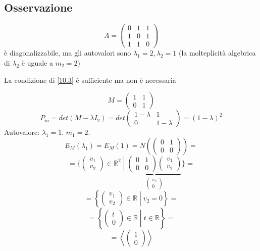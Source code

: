 \documentclass[a4paper]{article}
\theoremstyle{break}
\theoremstyle{break}
\theoremstyle{break}
\theoremstyle{break}
\begin{document}
\subsection{Osservazione}
\begin{example}
  \[
  A = \begin{pmatrix} 
    0 & 1 & 1\\
    1 & 0 & 1\\
    1 & 1 & 0
  \end{pmatrix} 
  \] 
  è diagonalizzabile, ma gli autovalori sono \( \lambda_1 = 2, \lambda_2 = 1 \) (la
  molteplicità algebrica di \( \lambda_2 \) è uguale a \( m_2 = 2 \))
\end{example}

\noindent La condizione di \ref{10.3} è sufficiente ma non è necessaria

\begin{example}
  \[
  M = \begin{pmatrix} 
    1 & 1\\
    0 & 1
  \end{pmatrix} 
  \] 
  \[
  P_m = det(M - \lambda I_2) = det \begin{pmatrix} 
    1-\lambda & 1\\
    0 & 1-\lambda
  \end{pmatrix}
  = (1-\lambda)^2
  \] 
  Autovalore: \( \lambda_1 = 1 \). \( m_1 = 2 \).
  \[
    E_M(\lambda_1) = E_M(1) = N \left( \begin{pmatrix} 
      0 & 1\\
      0 & 0
    \end{pmatrix}  \right) =
  \] 
  \[
  = \Bigg\{\left. \begin{pmatrix} v_1\\v_2 \end{pmatrix} \in \mathbb{R}^2 \;\right|\;
      \underbrace{
      \begin{pmatrix} 
        0 & 1\\
        0 & 0
      \end{pmatrix}
      \begin{pmatrix} 
        v_1\\v_2
      \end{pmatrix}
    }_{\begin{pmatrix} v_2\\0 \end{pmatrix} }
    \Bigg\} =
  \] 
  \[
  = \left\{ \left. \begin{pmatrix} v_1\\v_2 \end{pmatrix} \in \mathbb{R} \;\right|\;
    v_2 = 0 \right\} =
  \] 
  \[
  = \left\{ \left. \begin{pmatrix} t\\0 \end{pmatrix} \in \mathbb{R} \;\right|\; t \in \mathbb{R} \right\} =
  \] 
  \[
  = \left< \begin{pmatrix} 1\\0 \end{pmatrix}  \right>
  \] 


\end{example}
\end{document}
